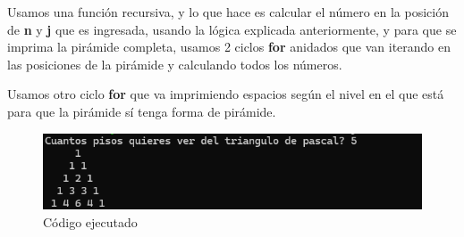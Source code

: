 \documentclass[letterpaper,12pt]{article}
\begin{document}
\clearpage

Usamos una función recursiva, y lo que hace es calcular el número en la posición de \textbf{n} y \textbf{j} que es ingresada, usando la lógica explicada anteriormente, y para que se imprima la pirámide completa, usamos 2 ciclos \textbf{for} anidados que van iterando en las posiciones de la pirámide y calculando todos los números.

Usamos otro ciclo \textbf{for} que va imprimiendo espacios según el nivel en el que está para que la pirámide sí tenga forma de pirámide.

\begin{figure}[H]
    \centering
    \includegraphics[width=15cm]{Imagenes/pascal.png}
    \caption{\centering Código ejecutado}
\end{figure}
\end{document}
